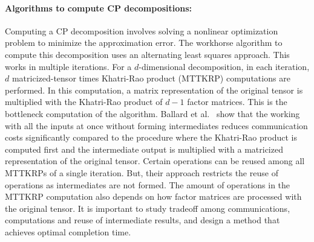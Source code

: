\documentclass[a4paper,11pt, margin=2cm]{article}
\newcommand{\bora}[1]{{\color{magenta} \emph{#1}}}
\newcommand{\sk}[1]{{\color{blue} \emph{#1}}}
\begin{document}
	\vspace*{-0.35cm}\paragraph{Algorithms to compute CP decompositions:}
	Computing a CP decomposition involves solving a nonlinear optimization problem to minimize the approximation error. The workhorse algorithm to compute this decomposition uses an alternating least squares approach. This works in multiple iterations. For a $d$-dimensional decomposition, in each iteration, $d$ matricized-tensor times Khatri-Rao product (MTTKRP) computations are performed. In this computation, a matrix representation of the original tensor is multiplied with the Khatri-Rao product
	of $d-1$ factor matrices. This is the bottleneck computation of the algorithm. 
	Ballard et al.~\cite{BNR-IPDPS-2018} show that the working
	with all the inputs at once without forming intermediates reduces communication costs significantly compared to the procedure where the Khatri-Rao product is computed first and the intermediate output is multiplied with a matricized representation of the original tensor. Certain operations can be reused among all MTTKRPs of a single iteration. But, their approach restricts the reuse of operations as intermediates are not formed. The amount of operations in the MTTKRP computation also depends on how factor matrices are processed with the original tensor.
	It is important to study tradeoff among communications, computations and reuse of intermediate results, and design a method that achieves optimal completion time.
	
	
	
\end{document}
